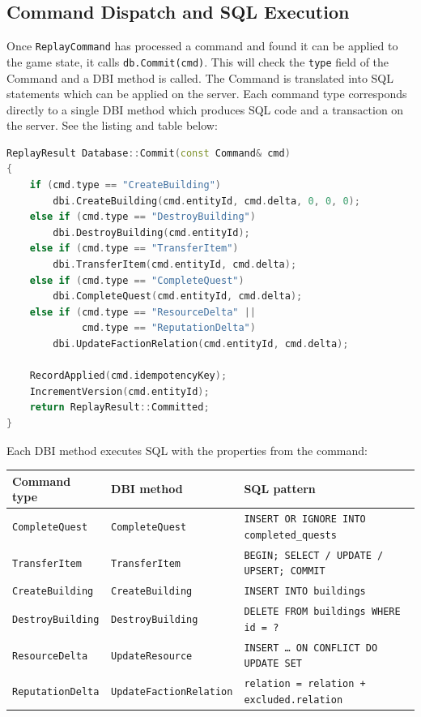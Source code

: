 \documentclass{article}
\begin{document}
\subsection{Command Dispatch and SQL Execution}
\label{sec:dispatch}

Once \texttt{ReplayCommand} has processed a command and found it can be applied to the game state, it calls \texttt{db.Commit(cmd)}. This will check the \texttt{type} field of the Command and a DBI method is called. The Command is translated into SQL statements which can be applied on the server. Each command type corresponds directly to a single DBI method which produces SQL code and a transaction on the server. See the listing and table below:

\newpage

\begin{lstlisting}[language=C++, caption={Server-side command dispatch to DBI methods}]
ReplayResult Database::Commit(const Command& cmd)
{
    if (cmd.type == "CreateBuilding")
        dbi.CreateBuilding(cmd.entityId, cmd.delta, 0, 0, 0);
    else if (cmd.type == "DestroyBuilding")
        dbi.DestroyBuilding(cmd.entityId);
    else if (cmd.type == "TransferItem")
        dbi.TransferItem(cmd.entityId, cmd.delta);
    else if (cmd.type == "CompleteQuest")
        dbi.CompleteQuest(cmd.entityId, cmd.delta);
    else if (cmd.type == "ResourceDelta" ||
             cmd.type == "ReputationDelta")
        dbi.UpdateFactionRelation(cmd.entityId, cmd.delta);

    RecordApplied(cmd.idempotencyKey);
    IncrementVersion(cmd.entityId);
    return ReplayResult::Committed;
}
\end{lstlisting}

Each DBI method executes SQL with the properties from the command:

\begin{center}
\begin{tabular}{lll}
\hline
Command type & DBI method & SQL pattern \\
\hline
\texttt{CompleteQuest}   & \texttt{CompleteQuest}         & \texttt{INSERT OR IGNORE INTO completed\_quests} \\
\texttt{TransferItem}    & \texttt{TransferItem}          & \texttt{BEGIN; SELECT / UPDATE / UPSERT; COMMIT} \\
\texttt{CreateBuilding}  & \texttt{CreateBuilding}        & \texttt{INSERT INTO buildings} \\
\texttt{DestroyBuilding} & \texttt{DestroyBuilding}       & \texttt{DELETE FROM buildings WHERE id = ?} \\
\texttt{ResourceDelta}   & \texttt{UpdateResource}        & \texttt{INSERT … ON CONFLICT DO UPDATE SET} \\
\texttt{ReputationDelta} & \texttt{UpdateFactionRelation} & \texttt{relation = relation + excluded.relation} \\
\hline
\end{tabular}
\end{center}
\end{document}
